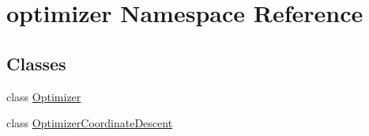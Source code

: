 \hypertarget{namespaceoptimizer}{}\section{optimizer Namespace Reference}
\label{namespaceoptimizer}
\subsection*{Classes}
\begin{DoxyCompactItemize}
\item 
class \mbox{\hyperlink{classoptimizer_1_1_optimizer}{Optimizer}}
\item 
class \mbox{\hyperlink{classoptimizer_1_1_optimizer_coordinate_descent}{Optimizer\+Coordinate\+Descent}}
\end{DoxyCompactItemize}

